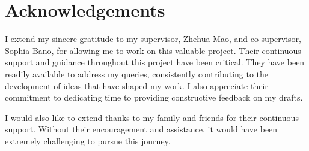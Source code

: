 \chapter*{Acknowledgements}

I extend my sincere gratitude to my supervisor, Zhehua Mao, and
co-supervisor, Sophia Bano, for allowing me to work on this valuable
project. Their continuous support and guidance throughout this project
have been critical. They have been readily available to address my
queries, consistently contributing to the development of ideas that
have shaped my work. I also appreciate their commitment to dedicating
time to providing constructive feedback on my drafts.

I would also like to extend thanks to my family and friends for their
continuous support. Without their encouragement and assistance, it
would have been extremely challenging to pursue this journey.
